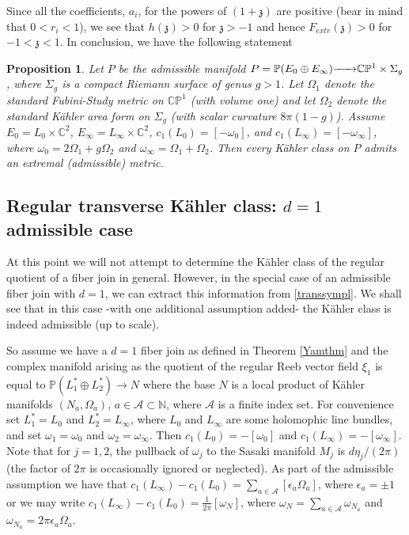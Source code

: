 \documentclass[12pt]{amsart}
\newtheorem{proposition}[theorem]{Proposition}
\def\bbc{{\mathbb C}}
\def\bbn{{\mathbb N}}
\def\bbp{{\mathbb P}}
\def\gro{\omega}
\def\cala{{\mathcal A}}
\def\ra#1{\hbox to #1pc{\rightarrowfill}}
\def\gz{{\mathfrak z}}
\begin{document}
Since all the coefficients, $a_i$, for the powers of $(1+\gz)$ are positive (bear in mind that $0<r_i<1$), we see that $h(\gz)>0$ for $\gz>-1$ and hence
$F_{extr}(\gz)>0$ for $-1<\gz<1$. In conclusion, we have the following statement

\begin{proposition}\label{appenprop}
Let $P$ be the admissible manifold $P=\bbp(E_0\oplus E_\infty)\ra{1.8} \bbc\bbp^1\times\Sigma_g$, where $\Sigma_g$ is a compact Riemann surface of genus $g>1$. Let $\Omega_1$ denote the standard Fubini-Study metric on $\bbc\bbp^1$ (with volume one) and let
$\Omega_2$ denote the standard K\"ahler area form on $\Sigma_g$ (with scalar curvature $8\pi(1-g)$).
Assume
$E_0=L_0 \times \bbc^2$, $E_\infty=L_\infty \times \bbc^2$, $c_1(L_0)=[-\omega_0]$, and $c_1(L_\infty)=[-\omega_\infty]$, where
$\omega_0=2\Omega_1+g\Omega_2$ and $\omega_\infty =  \Omega_1+\Omega_2$.
Then every K\"ahler class on $P$ admits an extremal (admissible) metric.
\end{proposition}


\subsection{Regular transverse K\"ahler class: $d=1$ admissible case}\label{kahclass}

At this point we will not attempt to determine the K\"ahler class of the regular quotient of a fiber join in general. However, in the special case of an admissible fiber join with $d=1$, we can extract this information from \eqref{transsympl}. We shall see that in this case -with one additional assumption added- the K\"ahler class is indeed admissible (up to scale).

So assume we have a $d=1$ fiber join as defined in Theorem \ref{Yamthm} and the complex manifold arising as the quotient of the regular Reeb vector field $\xi_1$ 
is equal to $\bbp\left(L^*_1\oplus L^*_2\right) \rightarrow N$ where the base $N$ is a local product of K\"ahler manifolds $(N_a,\Omega_a)$, $a \in \cala \subset \bbn$, where $\cala$ is a finite index set.
For convenience set $L^*_1= L_0$ and $L^*_2= L_\infty$, where $L_0$ and $L_\infty$ are some holomophic line bundles, and set
$\omega_1=\omega_0$ and $\omega_2=\omega_\infty$. Then $c_1(L_0)=-[\omega_0]$ and $c_1(L_\infty)=-[\omega_\infty]$.
Note that for $j=1,2$, the pullback of $\omega_j$ to the Sasaki manifold $M_j$ is $d\eta_j/(2\pi)$ (the factor of $2\pi$ is occasionally ignored or neglected). As part of the admissible assumption we have that
$c_1(L_\infty)-c_1(L_0)= \sum_{a\in \cala}  [\epsilon_a\Omega_a]$, where $\epsilon_a=\pm 1$ or we may write
$c_1(L_\infty)-c_1(L_0)=\frac{1}{2\pi}[\gro_N]$, where $\gro_N=\sum_{a\in \cala}\gro_{N_a}$ and $\gro_{N_a}=2\pi\epsilon_a\Omega_a$.
\end{document}
